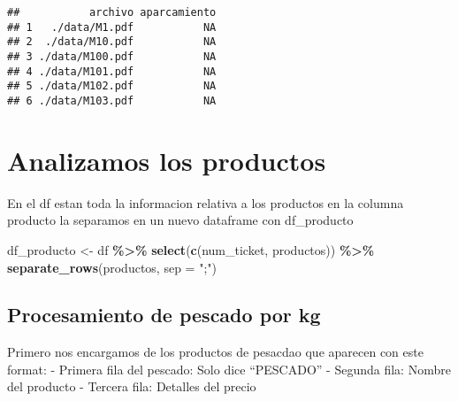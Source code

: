\documentclass[,,,oneauthor,pdftex]{Definitions/mdpi}
\newenvironment{Shaded}{\begin{snugshade}}{\end{snugshade}}
\newcommand{\AttributeTok}[1]{\textcolor[rgb]{0.13,0.29,0.53}{#1}}
\newcommand{\FunctionTok}[1]{\textcolor[rgb]{0.13,0.29,0.53}{\textbf{#1}}}
\newcommand{\NormalTok}[1]{#1}
\newcommand{\OtherTok}[1]{\textcolor[rgb]{0.56,0.35,0.01}{#1}}
\newcommand{\SpecialCharTok}[1]{\textcolor[rgb]{0.81,0.36,0.00}{\textbf{#1}}}
\newcommand{\StringTok}[1]{\textcolor[rgb]{0.31,0.60,0.02}{#1}}
\begin{document}
\begin{verbatim}
##           archivo aparcamiento
## 1   ./data/M1.pdf           NA
## 2  ./data/M10.pdf           NA
## 3 ./data/M100.pdf           NA
## 4 ./data/M101.pdf           NA
## 5 ./data/M102.pdf           NA
## 6 ./data/M103.pdf           NA
\end{verbatim}

\hypertarget{analizamos-los-productos}{%
\section{Analizamos los productos}\label{analizamos-los-productos}}

En el df estan toda la informacion relativa a los productos en la
columna producto la separamos en un nuevo dataframe con df\_producto

\begin{Shaded}
\begin{Highlighting}[]
\NormalTok{df\_producto }\OtherTok{\textless{}{-}}\NormalTok{ df }\SpecialCharTok{\%\textgreater{}\%} \FunctionTok{select}\NormalTok{(}\FunctionTok{c}\NormalTok{(num\_ticket, productos)) }\SpecialCharTok{\%\textgreater{}\%} 
  \FunctionTok{separate\_rows}\NormalTok{(productos, }\AttributeTok{sep =} \StringTok{";"}\NormalTok{)}
\end{Highlighting}
\end{Shaded}

\hypertarget{procesamiento-de-pescado-por-kg}{%
\subsection{Procesamiento de pescado por
kg}\label{procesamiento-de-pescado-por-kg}}

Primero nos encargamos de los productos de pesacdao que aparecen con
este format: - Primera fila del pescado: Solo dice ``PESCADO'' - Segunda
fila: Nombre del producto - Tercera fila: Detalles del precio
\end{document}
